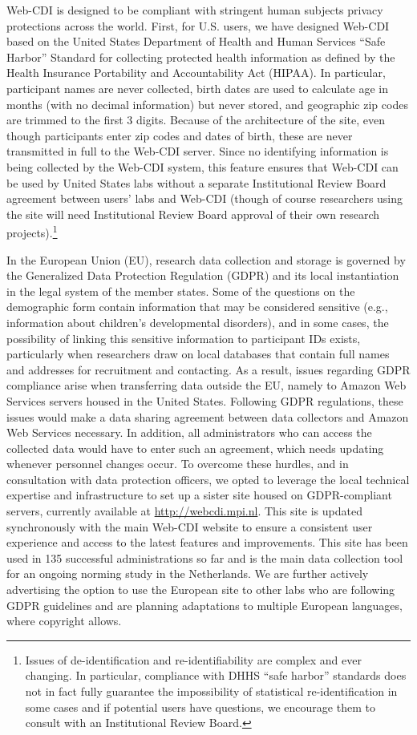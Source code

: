 \documentclass[
  english,
  ,man,floatsintext]{apa6}
\begin{document}
Web-CDI is designed to be compliant with stringent human subjects privacy protections across the world. First, for U.S. users, we have designed Web-CDI based on the United States Department of Health and Human Services ``Safe Harbor'' Standard for collecting protected health information as defined by the Health Insurance Portability and Accountability Act (HIPAA). In particular, participant names are never collected, birth dates are used to calculate age in months (with no decimal information) but never stored, and geographic zip codes are trimmed to the first 3 digits. Because of the architecture of the site, even though participants enter zip codes and dates of birth, these are never transmitted in full to the Web-CDI server. Since no identifying information is being collected by the Web-CDI system, this feature ensures that Web-CDI can be used by United States labs without a separate Institutional Review Board agreement between users' labs and Web-CDI (though of course researchers using the site will need Institutional Review Board approval of their own research projects).\footnote{Issues of de-identification and re-identifiability are complex and ever changing. In particular, compliance with DHHS ``safe harbor'' standards does not in fact fully guarantee the impossibility of statistical re-identification in some cases and if potential users have questions, we encourage them to consult with an Institutional Review Board.}

In the European Union (EU), research data collection and storage is governed by the Generalized Data Protection Regulation (GDPR) and its local instantiation in the legal system of the member states. Some of the questions on the demographic form contain information that may be considered sensitive (e.g., information about children's developmental disorders), and in some cases, the possibility of linking this sensitive information to participant IDs exists, particularly when researchers draw on local databases that contain full names and addresses for recruitment and contacting. As a result, issues regarding GDPR compliance arise when transferring data outside the EU, namely to Amazon Web Services servers housed in the United States. Following GDPR regulations, these issues would make a data sharing agreement between data collectors and Amazon Web Services necessary. In addition, all administrators who can access the collected data would have to enter such an agreement, which needs updating whenever personnel changes occur. To overcome these hurdles, and in consultation with data protection officers, we opted to leverage the local technical expertise and infrastructure to set up a sister site housed on GDPR-compliant servers, currently available at \url{http://webcdi.mpi.nl}. This site is updated synchronously with the main Web-CDI website to ensure a consistent user experience and access to the latest features and improvements. This site has been used in 135 successful administrations so far and is the main data collection tool for an ongoing norming study in the Netherlands. We are further actively advertising the option to use the European site to other labs who are following GDPR guidelines and are planning adaptations to multiple European languages, where copyright allows.
\end{document}
